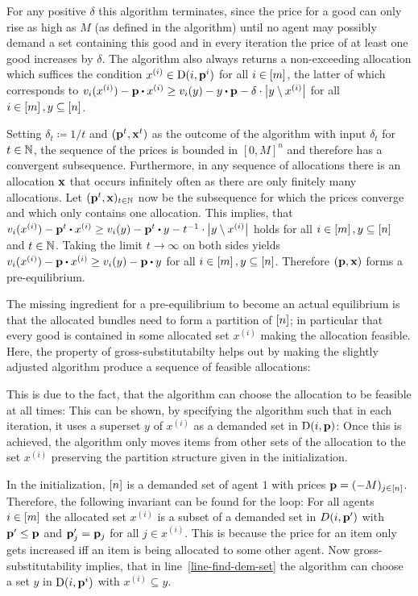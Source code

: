 For any positive $\delta$ this algorithm terminates, since the price for a good can only rise as high as $M$ (as defined in the algorithm) until no agent may possibly demand a set containing this good and in every iteration the price of at least one good increases by $\delta$.
The algorithm also always returns a non-exceeding allocation which suffices the condition $x^{(i)}\in\operatorname{D}(i,\mathbf{p}^i)$ for all $i\in\left[ m \right]$, the latter of which corresponds to $v_i(x^{(i)}) - \fp \bcdot x^{(i)} \geq v_i(y) - y \bcdot \fp - \delta \cdot \abs{y \setminus x^{(i)}}$ for all $i\in\left[ m \right], y\subseteq\left[ n \right]$.

Setting $\delta_t \coloneqq 1/t$ and $(\mathbf{p}^t, \mathbf{x}^t)$ as the outcome of the algorithm with input $\delta_t$ for $t\in\mathbb{N}$, the sequence of the prices is bounded in $[0, M]^n$ and therefore has a convergent subsequence.
Furthermore, in any sequence of allocations there is an allocation $\mathbf{x}$ that occurs infinitely often as there are only finitely many allocations.
Let $(\mathbf{p}^t, \mathbf{x})_{t\in\mathbb{N}}$ now be the subsequence for which the prices converge and which only contains one allocation.
This implies, that $v_i(x^{(i)}) - \fp^t \bcdot x^{(i)} \geq v_i(y) - \fp^t \bcdot y - t^{-1} \cdot \abs{ y \setminus x^{(i)}}$ holds for all $i\in\left[ m \right], y\subseteq\left[ n \right]$ and $t\in\mathbb{N}$.
Taking the limit $t\rightarrow\infty$ on both sides yields $v_i(x^{(i)}) - \fp \bcdot x^{(i)} \geq v_i(y) - \fp\bcdot y$ for all $i\in\left[ m \right], y\subseteq\left[ n \right]$.
Therefore $(\mathbf{p}, \mathbf{x})$ forms a pre-equilibrium.

The missing ingredient for a pre-equilibrium to become an actual equilibrium is that the allocated bundles need to form a partition of $\left[ n \right]$; in particular that every good is contained in some allocated set $x^{(i)}$ making the allocation feasible.
Here, the property of gross-substitutabilty helps out by making the slightly adjusted algorithm produce a sequence of feasible allocations:

This is due to the fact, that the algorithm can choose the allocation to be feasible at all times:
This can be shown, by specifying the algorithm such that in each iteration, it uses a superset $y$ of $x^{(i)}$ as a demanded set in $\operatorname{D}(i, \mathbf{p})$:
Once this is achieved, the algorithm only moves items from other sets of the allocation to the set $x^{(i)}$ preserving the partition structure given in the initialization. 

In the initialization, $\left[ n \right]$ is a demanded set of agent $1$ with prices $\mathbf{p}= (-M)_{j\in\left[ n \right]}$.
Therefore, the following invariant can be found for the loop:
For all agents $i\in\left[ m \right]$ the allocated set $x^{(i)}$ is a subset of a demanded set in $D(i, \mathbf{p}')$ with $\mathbf{p}' \leq \mathbf{p}$ and $\mathbf{p}'_j = \mathbf{p}_j$ for all $j\in x^{(i)}$.
This is because the price for an item only gets increased iff an item is being allocated to some other agent.
Now gross-substitutability implies, that in line~\ref{line-find-dem-set} the algorithm can choose a set $y$ in $\operatorname{D}(i, \mathbf{p}^i)$ with $x^{(i)}\subseteq y$.

